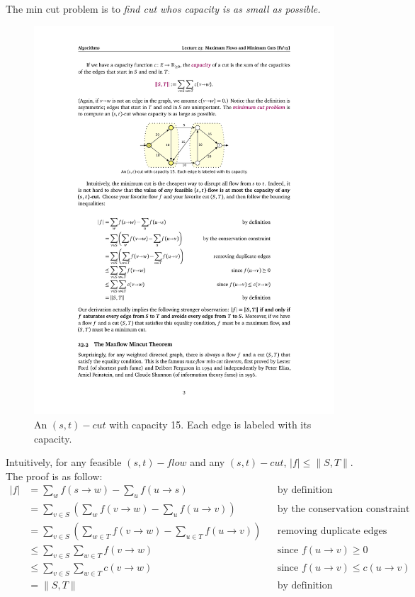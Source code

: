 The min cut problem is to \emph{find cut whos capacity is as small as possible.}
\begin{figure}[H]
    \centering
    \includegraphics[scale=1.5]{fig/cutExample}
    \caption{An $(s,t)-cut$ with capacity 15. Each edge is labeled with its capacity.}
    \label{fig:cutExample}
\end{figure}

Intuitively, for any feasible $(s,t)-flow$ and any $(s,t)-cut$,
$|f| \leq \|S,T\|$. The proof is as follow:
\begin{align*}
    |f| &= \sum_w f(s \rightarrow w) - \sum_u f(u \rightarrow s) &&\text{by definition}\\
        &= \sum_{v \in S} \left(\sum_w f(v \rightarrow w) - \sum_u f(u \rightarrow v)\right) && \text{by the conservation constraint}\\
        &= \sum_{v \in S} \left(\sum_{w \in T} f(v \rightarrow w) - \sum_{u \in T} f(u \rightarrow v)\right) && \text{removing duplicate edges}\\
        &\leq \sum_{v \in S}\sum_{w \in T} f(v \rightarrow w) && \text{since $f(u \rightarrow v) \geq 0$} \\
        &\leq \sum_{v \in S}\sum_{w \in T} c(v \rightarrow w) && \text{since $f(u \rightarrow v) \leq c(u \rightarrow v)$} \\
        &= \|S,T\| && \text{by definition}
\end{align*}


